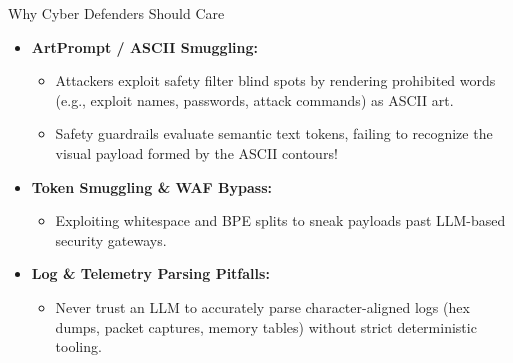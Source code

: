 \documentclass[aspectratio=169,11pt,xcolor={table,dvipsnames}]{beamer}
\begin{document}
\begin{frame}{Why Cyber Defenders Should Care}
  \begin{itemize}
    \item \textbf{ArtPrompt / ASCII Smuggling:}
      \begin{itemize}
        \item Attackers exploit safety filter blind spots by rendering prohibited words (e.g., exploit names, passwords, attack commands) as ASCII art.
        \item Safety guardrails evaluate semantic text tokens, failing to recognize the visual payload formed by the ASCII contours!
      \end{itemize}
    \item \textbf{Token Smuggling \& WAF Bypass:}
      \begin{itemize}
        \item Exploiting whitespace and BPE splits to sneak payloads past LLM-based security gateways.
      \end{itemize}
    \item \textbf{Log \& Telemetry Parsing Pitfalls:}
      \begin{itemize}
        \item Never trust an LLM to accurately parse character-aligned logs (hex dumps, packet captures, memory tables) without strict deterministic tooling.
      \end{itemize}
  \end{itemize}
\end{frame}
\end{document}
